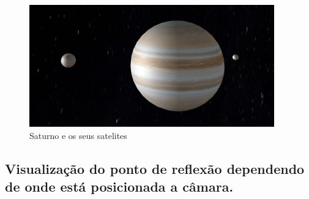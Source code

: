 \documentclass[12pt,a4paper]{memoir}
\begin{document}
\begin{figure}[!htb]
\centering
\includegraphics[width=300pt]{Saturno.jpg}
\caption{Saturno e os seus satelites}
\end{figure}

\newpage

\subsection{Visualização do ponto de reflexão dependendo de onde está posicionada a câmara.}
\end{document}
